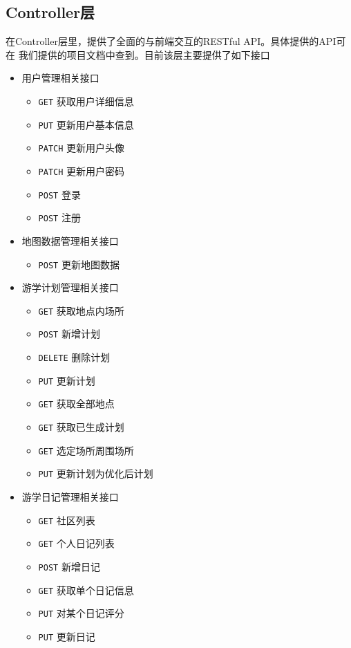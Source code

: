 \documentclass{report}
\begin{document}
\subsection{Controller层}
在Controller层里，提供了全面的与前端交互的RESTful API。具体提供的API可在
我们提供的项目文档中查到。目前该层主要提供了如下接口
\begin{itemize}
    \item 用户管理相关接口
    \begin{itemize}
        \item \verb|GET| 获取用户详细信息
        \item \verb|PUT| 更新用户基本信息
        \item \verb|PATCH| 更新用户头像
        \item \verb|PATCH| 更新用户密码
        \item \verb|POST| 登录
        \item \verb|POST| 注册
    \end{itemize}
    \item 地图数据管理相关接口
    \begin{itemize}
        \item \verb|POST| 更新地图数据
    \end{itemize}
    \item 游学计划管理相关接口
    \begin{itemize}
        \item \verb|GET| 获取地点内场所
        \item \verb|POST| 新增计划
        \item \verb|DELETE| 删除计划
        \item \verb|PUT| 更新计划
        \item \verb|GET| 获取全部地点
        \item \verb|GET| 获取已生成计划
        \item \verb|GET| 选定场所周围场所
        \item \verb|PUT| 更新计划为优化后计划
    \end{itemize}
    \item 游学日记管理相关接口
    \begin{itemize}
        \item \verb|GET| 社区列表
        \item \verb|GET| 个人日记列表
        \item \verb|POST| 新增日记
        \item \verb|GET| 获取单个日记信息
        \item \verb|PUT| 对某个日记评分
        \item \verb|PUT| 更新日记
    \end{itemize}
\end{itemize}
\end{document}
